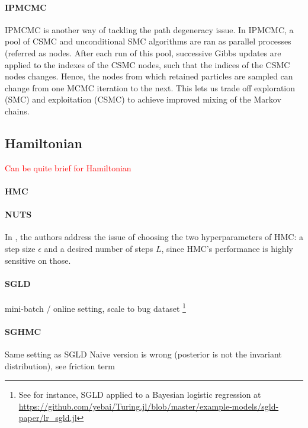 \paragraph{\gls{IPMCMC}}
\gls{IPMCMC} \cite{Rainforth:2016wq} is another way of tackling the path degeneracy issue.
In \gls{IPMCMC}, a pool of \gls{CSMC} and unconditional \gls{SMC} algorithms are ran as parallel processes (referred as nodes. After each run of this pool, successive Gibbs updates are applied to the indexes of the \gls{CSMC} nodes, such that the indices of the \gls{CSMC} nodes changes. Hence, the nodes from which retained particles are sampled can change from one \gls{MCMC} iteration to the next. This lets us trade off exploration (\gls{SMC}) and exploitation (\gls{CSMC}) to achieve improved mixing of the Markov chains.

\subsection{Hamiltonian}
\textcolor{red}{Can be quite brief for Hamiltonian}

\paragraph{\gls{HMC}}


\paragraph{\gls{NUTS}}
In \cite{NUTS}, the authors address the issue of choosing the two hyperparameters of \gls{HMC}: a step size $\epsilon$ and a desired number of steps $L$, since \gls{HMC}'s performance is highly sensitive on those.
\cite{Nesterov2009}

\paragraph{\gls{SGLD}}
mini-batch / online setting, scale to bug dataset
\footnote{See for instance, \gls{SGLD} applied to a Bayesian logistic regression at \url{https://github.com/yebai/Turing.jl/blob/master/example-models/sgld-paper/lr_sgld.jl}}
 \cite{SGLD}

\paragraph{\gls{SGHMC}}
Same setting as \gls{SGLD}
Naive version is wrong (posterior is not the invariant distribution), see \cite{SGMCMC}
friction term
 \cite{SGHMC}
 
